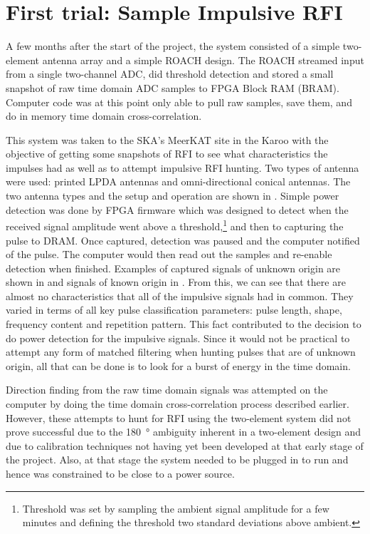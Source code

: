 \section{First trial: Sample Impulsive RFI}

A few months after the start of the project, the system consisted of a simple two-element antenna array and a simple ROACH design. The ROACH streamed input from a single two-channel ADC, did threshold detection and stored a small snapshot of raw time domain ADC samples to FPGA Block RAM (BRAM). Computer code was at this point only able to pull raw samples, save them, and do in memory time domain cross-correlation. 

This system was taken to the SKA's MeerKAT site in the Karoo with the objective of getting some snapshots of RFI to see what characteristics the impulses had as well as to attempt impulsive RFI hunting. Two types of antenna were used: printed LPDA antennas and omni-directional conical antennas.
The two antenna types and the setup and operation are shown in . Simple power detection was done by FPGA firmware which was designed to detect when the received signal amplitude went above a threshold,\footnote{Threshold was set by sampling the ambient signal amplitude for a few minutes and defining the threshold two standard deviations above ambient.} and then to capturing the pulse to DRAM. Once captured, detection was paused and the computer notified of the pulse. The computer would then read out the samples and re-enable detection when finished. Examples of captured signals of unknown origin are shown in  and signals of known origin in . From this, we can see that there are almost no characteristics that all of the impulsive signals had in common. They varied in terms of all key pulse classification parameters: pulse length, shape, frequency content and repetition pattern. This fact contributed to the decision to do power detection for the impulsive signals. Since it would not be practical to attempt any form of matched filtering when hunting pulses that are of unknown origin, all that can be done is to look for a burst of energy in the time domain.

Direction finding from the raw time domain signals was attempted on the computer by doing the time domain cross-correlation process described earlier. However, these attempts to hunt for RFI using the two-element system did not prove successful due to the \SI{180}{\degree} ambiguity inherent in a two-element design and due to calibration techniques not having yet been developed at that early stage of the project. Also, at that stage the system needed to be plugged in to run and hence was constrained to be close to a power source.

